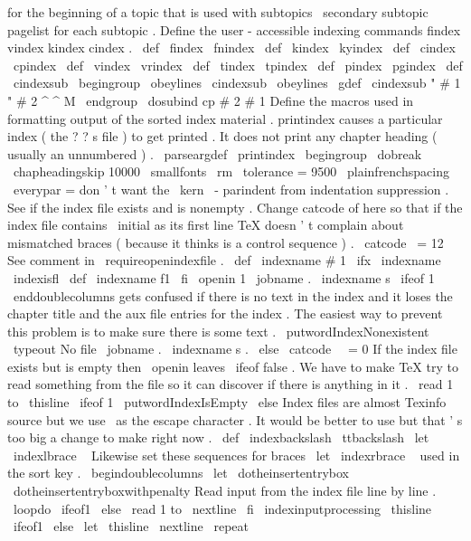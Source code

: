 {{{{{}
%
for
the
beginning
of
a
topic
that
is
used
with
subtopics
%
\
secondary
{
subtopic
}
{
pagelist
}
%
for
each
subtopic
.
%
Define
the
user
-
accessible
indexing
commands
%
findex
vindex
kindex
cindex
.
\
def
\
findex
{
\
fnindex
}
\
def
\
kindex
{
\
kyindex
}
\
def
\
cindex
{
\
cpindex
}
\
def
\
vindex
{
\
vrindex
}
\
def
\
tindex
{
\
tpindex
}
\
def
\
pindex
{
\
pgindex
}
\
def
\
cindexsub
{
\
begingroup
\
obeylines
\
cindexsub
}
{
\
obeylines
%
\
gdef
\
cindexsub
"
#
1
"
#
2
^
^
M
{
\
endgroup
%
\
dosubind
{
cp
}
{
#
2
}
{
#
1
}
}
}
%
Define
the
macros
used
in
formatting
output
of
the
sorted
index
material
.
%
printindex
causes
a
particular
index
(
the
?
?
s
file
)
to
get
printed
.
%
It
does
not
print
any
chapter
heading
(
usually
an
unnumbered
)
.
%
\
parseargdef
\
printindex
{
\
begingroup
\
dobreak
\
chapheadingskip
{
10000
}
%
%
\
smallfonts
\
rm
\
tolerance
=
9500
\
plainfrenchspacing
\
everypar
=
{
}
%
don
'
t
want
the
\
kern
\
-
parindent
from
indentation
suppression
.
%
%
See
if
the
index
file
exists
and
is
nonempty
.
%
Change
catcode
of
here
so
that
if
the
index
file
contains
%
\
initial
{
}
%
as
its
first
line
TeX
doesn
'
t
complain
about
mismatched
braces
%
(
because
it
thinks
}
is
a
control
sequence
)
.
\
catcode
\
=
12
%
See
comment
in
\
requireopenindexfile
.
\
def
\
indexname
{
#
1
}
\
ifx
\
indexname
\
indexisfl
\
def
\
indexname
{
f1
}
\
fi
\
openin
1
\
jobname
.
\
indexname
s
\
ifeof
1
%
\
enddoublecolumns
gets
confused
if
there
is
no
text
in
the
index
%
and
it
loses
the
chapter
title
and
the
aux
file
entries
for
the
%
index
.
The
easiest
way
to
prevent
this
problem
is
to
make
sure
%
there
is
some
text
.
\
putwordIndexNonexistent
\
typeout
{
No
file
\
jobname
.
\
indexname
s
.
}
%
\
else
\
catcode
\
\
=
0
%
%
If
the
index
file
exists
but
is
empty
then
\
openin
leaves
\
ifeof
%
false
.
We
have
to
make
TeX
try
to
read
something
from
the
file
so
%
it
can
discover
if
there
is
anything
in
it
.
\
read
1
to
\
thisline
\
ifeof
1
\
putwordIndexIsEmpty
\
else
%
Index
files
are
almost
Texinfo
source
but
we
use
\
as
the
escape
%
character
.
It
would
be
better
to
use
but
that
'
s
too
big
a
change
%
to
make
right
now
.
\
def
\
indexbackslash
{
\
ttbackslash
}
%
\
let
\
indexlbrace
\
{
%
Likewise
set
these
sequences
for
braces
\
let
\
indexrbrace
\
}
%
used
in
the
sort
key
.
\
begindoublecolumns
\
let
\
dotheinsertentrybox
\
dotheinsertentryboxwithpenalty
%
%
Read
input
from
the
index
file
line
by
line
.
\
loopdo
\
ifeof1
\
else
\
read
1
to
\
nextline
\
fi
%
\
indexinputprocessing
\
thisline
%
\
ifeof1
\
else
\
let
\
thisline
\
nextline
\
repeat
%
}}}}

